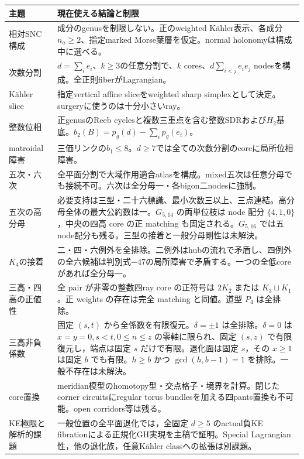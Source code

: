 \documentclass[11pt,a4paper]{article}
\begin{document}
\begin{center}
\begin{tabularx}{\linewidth}{@{}p{.27\linewidth}X@{}}
\toprule
主題 & 現在使える結論と制限\\
\midrule
相対SNC構成 & 成分のgenusを制限しない。正のweighted Kähler表示、各成分$n_a\ge2$、指定marked Morse葉層を仮定。normal holonomyは構成中に選べる。\\
次数分割 & $d=\sum_i e_i$、$k\ge3$の任意分割で、$k$ cores、$d\sum_{i<j}e_i e_j$ nodesを構成。全正則fiberがLagrangian。\\
Kähler slice & 指定vertical affine sliceをweighted sharp simplexとして決定。surgeryに使うのは十分小さいray。\\
整数位相 & 正genusのReeb cyclesと複数三重点を含む整数SDRおよび$H_2$基底。$b_2(B)=p_g(d)-\sum_i p_g(e_i)$。\\
matroidal障害 & 三価リンクの$b_1\le8$。$d\ge7$では全ての次数分割のcoreに局所位相障害。\\
五次・六次 & 全平面分割で大域作用適合atlasを構成。mixed五次は任意分母でも接続不可。六次は全分母一・各bigon二nodesに強制。\\
五次の高分母 & 必要支持は三型・二十六標識、最小次数三以上、三点連結。高分母全体の最大公約数は一。$G_{5,14}$ の両単位枝は node 配分 $\{4,1,0\}$，中央の四高 core の正 matching も固定される。$G_{5,16}$ では五node配分も残る。三型の接着と一般分母剛性は未解決。\\
$K_4$の接着 & 二・四・六例外を全排除。二例外はhubの流れで矛盾し、四例外の全六候補は判別式$-47$の局所障害で矛盾する。一つの全低coreがあれば全分母一。\\
三高・四高の正値性 & 全 pair が非零の整数四ray core の正符号は $2K_2$ または $K_3\sqcup K_1$。正 weights の存在は完全 matching と同値。道型 $P_4$ は全排除。\\
三高非負係数 & 固定 $(s,t)$ から全係数を有限復元。$\delta=\pm1$ は全排除。$\delta=0$ は $x=y=0,s<t,0\le n\le z$ の零軸に限られ、固定 $(s,z)$ で有限復元し，端点は固定 $s$ だけで有限。退化面は固定 $s$，その $x\ge1$ は固定 $b$ でも有限。$h\ge b$ かつ $\gcd(h,b-1)=1$ を排除。一般不存在は未解決。\\
core置換 & meridian模型のhomotopy型・交点格子・境界を計算。閉じたcorner circuitsにregular torus bundlesを加える四pants置換も不可能。open corridors等は残る。\\
KE極限と解析的課題 & 一般位置の全平面退化では，全固定 $d\ge5$ のactual負KE fibrationによる正規化GH実現を主稿で証明。Special Lagrangian性，他の退化族，任意Kähler classへの拡張は別課題。\\
\bottomrule
\end{tabularx}
\end{center}
\end{document}
